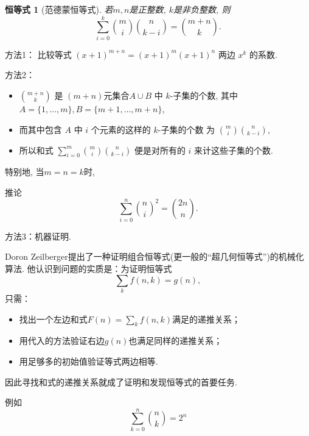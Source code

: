 \documentclass[punct]{ctexbeamer}
\newtheorem{iden}{恒等式}
\begin{document}
\begin{frame}
	\begin{iden}[范德蒙恒等式]\label{eq:V}
        若$m, n$是正整数, $k$是非负整数, 则
	$$
    \sum_{i=0}^{k}
    \binom{m}{i}
    \binom{n}{k-i} = \binom{m+n}{k}.$$
	\end{iden}

\pause


方法1：  比较等式 $(x+1)^{m+n}=(x+1)^{m}(x+1)^{n}$ 两边 $x^{k}$ 的系数.

方法2：
\begin{itemize}
\item   $\binom{m+n}{k}$ 是 $(m+n)$元集合$A \cup B$ 中 $k$-子集的个数, 其中 $A=\{1, \ldots, m\}, B=\{m+1, \ldots, m+n\}$,
\item 而其中包含 $A$ 中 $i$ 个元素的这样的 $k$-子集的个数 为 $\binom{m}{i}
\binom{n}{k-i}$,
\item  所以和式 $\sum_{i=0}^{m}\binom{m}{i}
\binom{n}{k-i}$ 便是对所有的 $i$ 来计这些子集的个数.

\end{itemize}
特别地, 当$m=n=k$时,
\begin{block}{推论}
    $$\sum_{i=0}^{n}\binom{n}{i}^{2}=\binom{2n}{n}.$$
\end{block}
\end{frame}

\begin{frame}

方法3：机器证明.

 Doron Zeilberger提出了一种证明组合恒等式(更一般的“超几何恒等式”)的机械化算法. 他认识到问题的实质是：为证明恒等式
$$\sum_k f(n,k)=g(n),$$
只需：
\begin{itemize}
    \item 找出一个左边和式$F(n)=\sum_k f(n,k)$满足的递推关系；
    \item 用代入的方法验证右边$g(n)$也满足同样的递推关系；
    \item 用足够多的初始值验证等式两边相等.
\end{itemize}
因此寻找和式的递推关系就成了证明和发现恒等式的首要任务.


例如
	$$\sum_{k=0}^n \binom{n}{k}=2^{n}$$
\end{frame}
\end{document}
